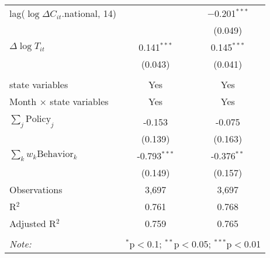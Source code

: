 \begin{tabular}{@{\extracolsep{1pt}}lcc}
  lag($\log \Delta C_{it}$.national, 14) &  & $-$0.201$^{***}$ \\ 
  &  & (0.049) \\ 
  $\Delta \log T_{it}$ & 0.141$^{***}$ & 0.145$^{***}$ \\ 
  & (0.043) & (0.041) \\ 
 \hline \\[-1.8ex] 
state variables & Yes & Yes \\ 
Month $\times$ state variables & Yes & Yes \\ 
\hline \\[-1.8ex] 
$\sum_j \mathrm{Policy}_j$ & -0.153 & -0.075 \\ 
 & (0.139) & (0.163) \\ 
$\sum_k w_k \mathrm{Behavior}_k$ & -0.793$^{***}$ & -0.376$^{**}$ \\ 
 & (0.149) & (0.157) \\ 
Observations & 3,697 & 3,697 \\ 
R$^{2}$ & 0.761 & 0.768 \\ 
Adjusted R$^{2}$ & 0.759 & 0.765 \\ 
\hline 
\hline \\[-1.8ex] 
\textit{Note:}  & \multicolumn{2}{r}{$^{*}$p$<$0.1; $^{**}$p$<$0.05; $^{***}$p$<$0.01} \\ 
\end{tabular} 